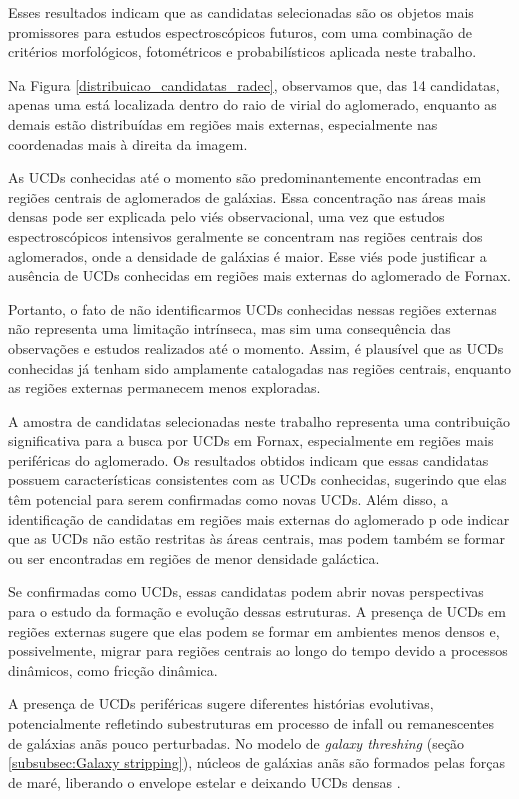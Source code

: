 Esses resultados indicam que as candidatas selecionadas são os objetos mais promissores para estudos espectroscópicos futuros, com uma combinação de critérios morfológicos, fotométricos e probabilísticos aplicada neste trabalho.

Na Figura \ref{distribuicao_candidatas_radec}, observamos que, das 14 candidatas, apenas uma está localizada dentro do raio de virial do aglomerado, enquanto as demais estão distribuídas em regiões mais externas, especialmente nas coordenadas mais à direita da imagem.

As UCDs conhecidas até o momento são predominantemente encontradas em regiões centrais de aglomerados de galáxias. Essa concentração nas áreas mais densas pode ser explicada pelo viés observacional, uma vez que estudos espectroscópicos intensivos geralmente se concentram nas regiões centrais dos aglomerados, onde a densidade de galáxias é maior. Esse viés pode justificar a ausência de UCDs conhecidas em regiões mais externas do aglomerado de Fornax.

Portanto, o fato de não identificarmos UCDs conhecidas nessas regiões externas não representa uma limitação intrínseca, mas sim uma consequência das observações e estudos realizados até o momento. Assim, é plausível que as UCDs conhecidas já tenham sido amplamente catalogadas nas regiões centrais, enquanto as regiões externas permanecem menos exploradas.

A amostra de candidatas selecionadas neste trabalho representa uma contribuição significativa para a busca por UCDs em Fornax, especialmente em regiões mais periféricas do aglomerado. Os resultados obtidos indicam que essas candidatas possuem características consistentes com as UCDs conhecidas, sugerindo que elas têm potencial para serem confirmadas como novas UCDs. Além disso, a identificação de candidatas em regiões mais externas do aglomerado p ode indicar que as UCDs não estão restritas às áreas centrais, mas podem também se formar ou ser encontradas em regiões de menor densidade galáctica.

Se confirmadas como UCDs, essas candidatas podem abrir novas perspectivas para o estudo da formação e evolução dessas estruturas. A presença de UCDs em regiões externas sugere que elas podem se formar em ambientes menos densos e, possivelmente, migrar para regiões centrais ao longo do tempo devido a processos dinâmicos, como fricção dinâmica. 

A presença de UCDs periféricas sugere diferentes histórias evolutivas, potencialmente refletindo subestruturas em processo de infall ou remanescentes de galáxias anãs pouco perturbadas. No modelo de \textit{galaxy threshing} (seção \ref{subsubsec:Galaxy stripping}), núcleos de galáxias anãs são formados pelas forças de maré, liberando o envelope estelar e deixando UCDs densas \citep{Thomas_2008}.

